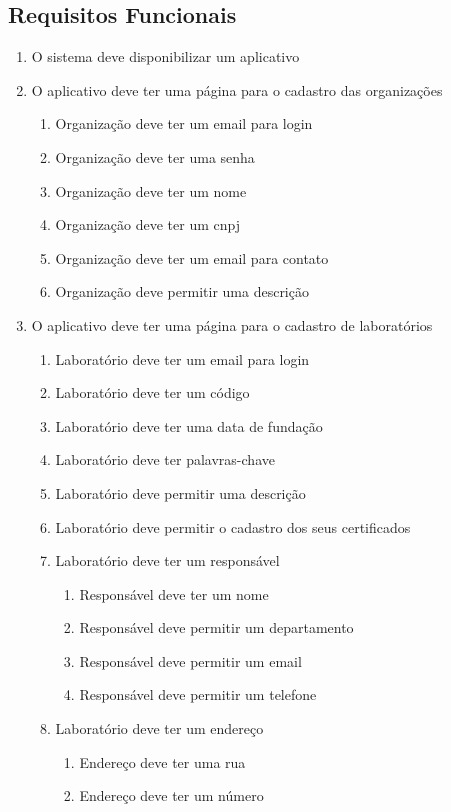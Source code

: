 \subsection{Requisitos Funcionais}\label{subsec:rf}
\begin{enumerate}
    \item O sistema deve disponibilizar um aplicativo
    \item O aplicativo deve ter uma página para o cadastro das organizações
	\begin{enumerate}
		\item Organização deve ter um email para login
		\item Organização deve ter uma senha
		\item Organização deve ter um nome
		\item Organização deve ter um cnpj
		\item Organização deve ter um email para contato
		\item Organização deve permitir uma descrição
	\end{enumerate}
    \item O aplicativo deve ter uma página para o cadastro de laboratórios
	\begin{enumerate}
		\item Laboratório deve ter um email para login
		\item Laboratório deve ter um código
		\item Laboratório deve ter uma data de fundação
		\item Laboratório deve ter palavras-chave
		\item Laboratório deve permitir uma descrição
		\item Laboratório deve permitir o cadastro dos seus certificados
		\item Laboratório deve ter um responsável
		\begin{enumerate}
			\item Responsável deve ter um nome
			\item Responsável deve permitir um departamento
			\item Responsável deve permitir um email
			\item Responsável deve permitir um telefone
		\end{enumerate}
		\item Laboratório deve ter um endereço
		\begin{enumerate}
			\item Endereço deve ter uma rua
			\item Endereço deve ter um número

\end{enumerate}
\end{enumerate}
\end{enumerate}
